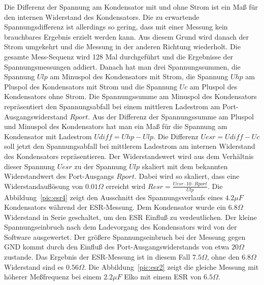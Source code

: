 Die Differenz der Spannung am Kondensator mit und ohne Strom ist ein Maß für den internen Widerstand des Kondensators.
Die zu erwartende Spannungsdifferenz ist allerdings so gering, dass mit einer Messung kein brauchbares Ergebnis erzielt
werden kann.
Aus diesem Grund wird danach der Strom umgekehrt und die Messung in der anderen Richtung wiederholt.
Die gesamte Mess-Sequenz wird 128 Mal durchgeführt und die Ergebnisse der Spannungsmessungen addiert.
Danach hat man drei Spannungssummen, die Spannung \(Ulp\) am Minuspol des Kondensators mit Strom, die Spannung \(Uhp\) am
Pluspol des Kondensators mit Strom und die Spannung \(Uc\) am Pluspol des Kondensators ohne Strom.
Die Spannungssumme am Minuspol des Kondensators repräsentiert den Spannungsabfall bei einem mittleren
Ladestrom am Port-Ausgangswiderstand \(Rport\). Aus der Differenz der Spannungssumme am Pluspol und Minuspol des Kondensators
hat man ein Maß für die Spannung am Kondensator mit Ladestrom \(Udiff = Uhp - Ulp\).
Die Differenz \(Uesr = Udiff - Uc\) soll jetzt den Spannungsabfall bei mittlerem Ladestrom am internen Widerstand des Kondensators
repräsentieren.
Der Widerstandswert wird aus dem Verhältnis dieser Spannung \(Uesr\) zu der Spannung \(Ulp\) skaliert mit dem
bekannten Widerstandwert des Port-Ausgangs \(Rport\). Dabei wird so skaliert, dass eine Widerstandauflösung von
\(0.01 \Omega\) erreicht wird \(Resr = \frac{Uesr \cdot 10 \cdot Rport}{Ulp}\).
Die Abbildung~\ref{pic:esr4} zeigt den Ausschnitt des Spannungsverlaufs eines \(4.2\mu F\) Kondensators
 während der ESR-Messung. Dem Kondensator wurde ein \(6.8 \Omega\) Widerstand in Serie geschaltet, um den ESR Einfluß
zu verdeutlichen. Der kleine Spannungseinbruch nach dem Ladevorgang des Kondensators wird von der Software ausgewertet.
Der größere Spannungseinbruch bei der Messung gegen GND kommt durch den Einfluß des Port-Ausgangswiderstands von etwa \(20 \Omega\) zustande.
Das Ergebnis der ESR-Messung ist in diesem Fall \(7.5 \Omega\), ohne den \(6.8 \Omega\) Widerstand sind es \(0.56 \Omega\).
Die Abbildung~\ref{pic:esr2} zeigt die gleiche Messung mit höherer Meßfrequenz bei einem \(2.2 \mu F\) Elko mit einem ESR von \(6.5 \Omega\).


